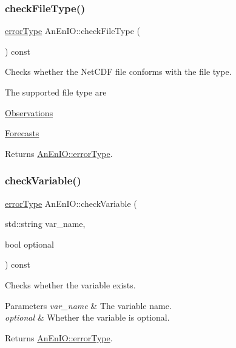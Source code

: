 \subsubsection{\texorpdfstring{check\+File\+Type()}{checkFileType()}}
{\footnotesize\ttfamily \mbox{\hyperlink{class_an_en_i_o_aa56bc1ec6610b86db4349bce20f9ead0}{error\+Type}} An\+En\+I\+O\+::check\+File\+Type (\begin{DoxyParamCaption}{ }\end{DoxyParamCaption}) const}

Checks whether the Net\+C\+DF file conforms with the file type.

The supported file type are
\begin{DoxyItemize}
\item \mbox{\hyperlink{class_observations}{Observations}}
\item \mbox{\hyperlink{class_forecasts}{Forecasts}}
\end{DoxyItemize}

\begin{DoxyReturn}{Returns}
\mbox{\hyperlink{class_an_en_i_o_aa56bc1ec6610b86db4349bce20f9ead0}{An\+En\+I\+O\+::error\+Type}}. 
\end{DoxyReturn}
\mbox{\label{class_an_en_i_o_ab7f3ba245b7acb11184e0a5b3490a84b}} 
\subsubsection{\texorpdfstring{check\+Variable()}{checkVariable()}}
{\footnotesize\ttfamily \mbox{\hyperlink{class_an_en_i_o_aa56bc1ec6610b86db4349bce20f9ead0}{error\+Type}} An\+En\+I\+O\+::check\+Variable (\begin{DoxyParamCaption}\item[{std\+::string}]{var\+\_\+name,  }\item[{bool}]{optional }\end{DoxyParamCaption}) const}

Checks whether the variable exists. 
\begin{DoxyParams}{Parameters}
{\em var\+\_\+name} & The variable name. \\
\hline
{\em optional} & Whether the variable is optional. \\
\hline
\end{DoxyParams}
\begin{DoxyReturn}{Returns}
\mbox{\hyperlink{class_an_en_i_o_aa56bc1ec6610b86db4349bce20f9ead0}{An\+En\+I\+O\+::error\+Type}}. 
\end{DoxyReturn}
\mbox{\label{class_an_en_i_o_a44347f497bdf775fcf214ec75d8b6470}} 
